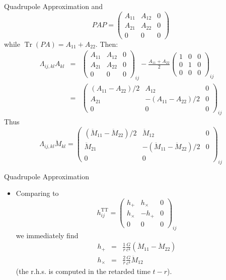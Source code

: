 \documentclass[size=11pt,style=paintings]{powerdot}
\begin{document}
\begin{slide}{Quadrupole Approximation}
 and 
 $$
P A P=\left(\begin{array}{ccc}{A_{11}} & {A_{12}} & {0} \\ {A_{21}} & {A_{22}} & {0} \\ {0} & {0} & {0}\end{array}\right)
$$
while $
\operatorname{Tr}(P A)=A_{11}+A_{22}
$. Then:
$$
\begin{aligned} \Lambda_{i j, k l} A_{k l} &=&\left(\begin{array}{ccc}{A_{11}}  &{A_{12}} & {0} \\ {A_{21}} & {A_{22}} & {0} \\ {0} & {0} & {0}\end{array}\right)_{ij} -\frac{A_{11}+A_{22}}{2}\left(\begin{array}{ccc}{1} & {0} & {0} \\ {0} & {1} & {0} \\ {0} & {0} & {0}\end{array}\right)_{i j} \\ &=&\left(\begin{array}{ccc}{\left(A_{11}-A_{22}\right) / 2} & {A_{12}} & {0} \\ {A_{21}} & {-\left(A_{11}-A_{22}\right) / 2} & {0} \\ {0} & {0} & {0}\end{array}\right)_{i j} \end{aligned}
$$
Thus
\vspace{-0.4cm}
$$
\Lambda_{i j, k l} \ddot{M}_{k l}=\left(\begin{array}{ccc}{\left(\ddot{M}_{11}-\ddot{M}_{22}\right) / 2} & {\ddot{M}_{12}} & {0} \\ {\ddot{M}_{21}} & {-\left(\ddot{M}_{11}-\ddot{M}_{22}\right) / 2} & {0} \\ {0} & {0}\end{array}\right)_{i j}
$$
 \end{slide}


\begin{slide}{Quadrupole Approximation}
 \begin{itemize}
 \item Comparing to 
 $$
h_{i j}^{\mathrm{TT}}=\left(\begin{array}{ccc}{h_{+}} & {h_{\times}} & {0} \\ {h_{\times}} & {-h_{+}} & {0} \\ {0} & {0} & {0}\end{array}\right)_{i j}
$$
we immediately find
\begin{eqnarray}
h_{+} &=&\frac{1}{r} \frac{G}{c^{4}}\left(\ddot{M}_{11}-\ddot{M}_{22}\right) \nonumber \\ h_{\times}&=&\frac{2}{r} \frac{G}{c^{4}} \ddot{M}_{12}\nonumber
\end{eqnarray}
(the r.h.s. is computed in the retarded time $t-r$).
 \end{itemize}
 \end{slide}
\end{document}
